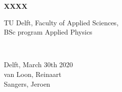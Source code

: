 \begin{titlepage}

\newcommand{\HRule}{\rule{\linewidth}{0.5mm}} %

\center


{ \huge \bfseries XXXX}\\[1cm] %






\vfill
\begin{minipage}{0.4\textwidth}
    \begin{flushleft}
        TU Delft, Faculty of Applied Sciences,\\
        BSc program Applied Physics
    \end{flushleft}
\end{minipage}
~
\begin{minipage}{0.4\textwidth}
    \begin{flushright}
        Delft, March 30th 2020\\
        van Loon, Reinaart\\
        Sangers, Jeroen
    \end{flushright}
\end{minipage}\\[1.5cm]


\end{titlepage}
